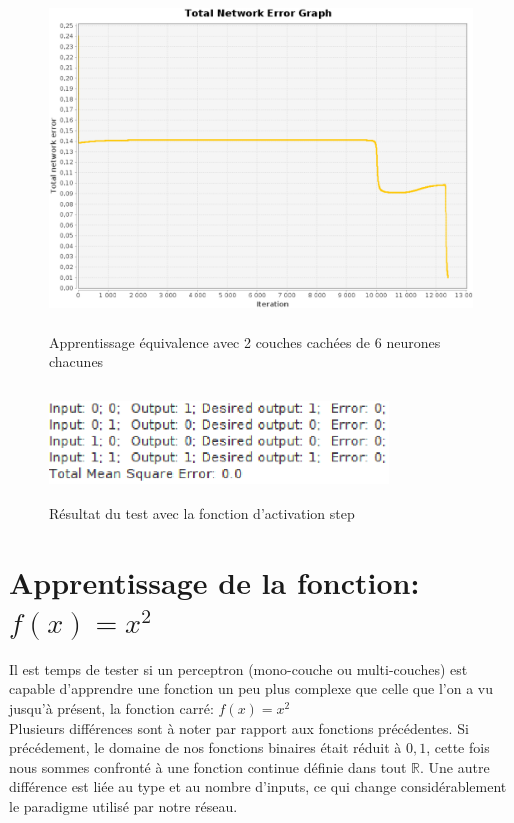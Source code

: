 \documentclass[twoside,openright,a4paper,11pt,french]{article}
\begin{document}
\begin{figure}[ht]
\centering
\includegraphics[width=12cm,height=9cm]{./pics/eq/multi_6_6_def.eps}
\caption{Apprentissage équivalence avec 2 couches cachées de 6 neurones chacunes}
\label{fig:eqmult2cc6}
\end{figure}

\begin{figure}[ht]
\centering
\includegraphics[width=9cm,height=3cm]{./pics/eq/stepeq.eps}
\caption{Résultat du test avec la fonction d'activation step}
\label{fig:eqstep}
\end{figure}

\clearpage



\section{Apprentissage de la fonction: $f(x) = x^2$}

Il est temps de tester si un perceptron (mono-couche ou multi-couches) est
capable d'apprendre une fonction un peu plus complexe que celle que l'on a vu
jusqu'à présent, la fonction carré: $f(x) = x^2$ \\

Plusieurs différences sont à noter par rapport aux fonctions précédentes.
Si précédement, le domaine de nos fonctions binaires était réduit à ${0,1}$, cette
fois nous sommes confronté à une fonction continue définie dans tout $\mathbb{R}$.
Une autre différence est liée au type et au nombre d'inputs, ce qui change
considérablement le paradigme utilisé par notre réseau.
\end{document}
